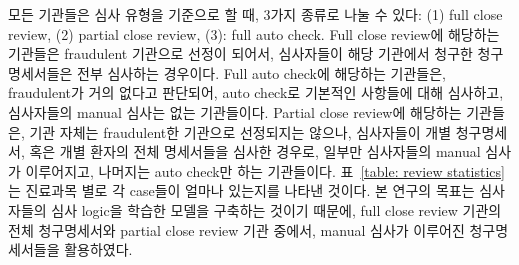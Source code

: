 \documentclass[11pt]{article}           %
\begin{document}
모든 기관들은 심사 유형을 기준으로 할 때, 3가지 종류로 나눌 수 있다: (1) full close review, (2) partial close review, (3): full auto check.
Full close review에 해당하는 기관들은 fraudulent 기관으로 선정이 되어서, 심사자들이 해당 기관에서 청구한 청구명세서들은 전부 심사하는 경우이다.
Full auto check에 해당하는 기관들은, fraudulent가 거의 없다고 판단되어, auto check로 기본적인 사항들에 대해 심사하고, 심사자들의 manual 심사는 없는 기관들이다.
Partial close review에 해당하는 기관들은, 기관 자체는 fraudulent한 기관으로 선정되지는 않으나, 심사자들이 개별 청구명세서, 혹은 개별 환자의 전체 명세서들을 심사한 경우로, 일부만 심사자들의 manual 심사가 이루어지고, 나머지는 auto check만 하는 기관들이다.
표~\ref{table: review statistics}는 진료과목 별로 각 case들이 얼마나 있는지를 나타낸 것이다.
본 연구의 목표는 심사자들의 심사 logic을 학습한 모델을 구축하는 것이기 때문에, full close review 기관의 전체 청구명세서와 partial close review 기관 중에서, manual 심사가 이루어진 청구명세서들을 활용하였다. 
\end{document}
